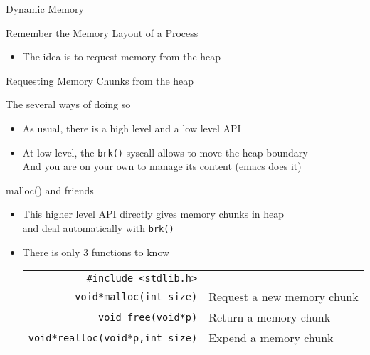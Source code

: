 \begin{frame}{Dynamic Memory}
\begin{block}{Remember the Memory Layout of a Process}
\begin{center}
    \end{center}\vspace{-1.5\baselineskip}
    \begin{itemize}
    \item The idea is to request memory from the heap
    \end{itemize}
  \end{block}
\end{frame}
\begin{frame}{Requesting Memory Chunks from the heap}
  \begin{block}{The several ways of doing so}
    \begin{itemize}
    \item As usual, there is a high level and a low level API
    \item At low-level, the \texttt{brk()} syscall allows to move the heap
      boundary\\
      And you are on your own to manage its content (emacs does it)
    \end{itemize}
  \end{block}
  \begin{block}{malloc() and friends}
    \begin{itemize}
    \item This higher level API directly gives memory chunks in heap\\
      {and deal automatically with \texttt{brk()}}
    \item There is only 3 functions to know

      \smallskip
      \begin{tabular}{rl}
      \texttt{\#include <stdlib.h>}\\
      \texttt{void*malloc(int size)}& Request a new memory chunk\\
      \texttt{void free(void*p)}& Return a memory chunk\\
      \texttt{void*realloc(void*p,int size)}& Expend a memory chunk        
      \end{tabular}
    \end{itemize}
  \end{block}
\end{frame}
